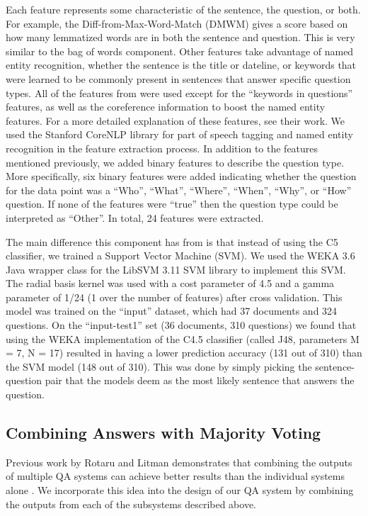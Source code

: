 \documentclass[11pt,letterpaper]{article}
\begin{document}
Each feature represents some characteristic of the sentence, the
question, or both.  For example, the Diff-from-Max-Word-Match (DMWM)
gives a score based on how many lemmatized words are in both the
sentence and question.  This is very similar to the bag of words
component.  Other features take advantage of named entity recognition,
whether the sentence is the title or dateline, or keywords that were
learned to be commonly present in sentences that answer specific
question types.  All of the features from \cite{Ng00amachine} were
used except for the ``keywords in questions'' features, as well as the
coreference information to boost the named entity features.  For a
more detailed explanation of these features, see their work.  We used
the Stanford CoreNLP library for part of speech tagging
\cite{Toutanova00enrichingthe} and named entity recognition
\cite{Finkel05incorporatingnon-local} in the feature extraction
process.  In addition to the features mentioned previously, we added
binary features to describe the question type.  More specifically, six
binary features were added indicating whether the question for the
data point was a ``Who'', ``What'', ``Where'', ``When'', ``Why'', or
``How'' question.  If none of the features were ``true'' then the
question type could be interpreted as ``Other''.   In total, 24
features were extracted.

The main difference this component has from \cite{Ng00amachine} is
that instead of using the C5 classifier, we trained a Support Vector
Machine (SVM).  We used the WEKA 3.6 \cite{Hall_theweka} Java wrapper
class for the LibSVM 3.11 \cite{Chang01libsvm:a} SVM library to
implement this SVM.  The radial basis kernel was used with a cost
parameter of 4.5 and a gamma parameter of 1/24 (1 over the number of
features) after cross validation.   This model was trained on the
``input'' dataset, which had 37 documents and 324 questions.  On the
``input-test1'' set (36 documents, 310 questions) we found that using
the WEKA implementation of the C4.5 classifier (called J48,
parameters M = 7, N = 17) resulted in having a lower prediction
accuracy (131 out of 310) than the SVM model (148 out of 310).  This was
done by simply picking the sentence-question pair that the models deem as
the most likely sentence that answers the question. 


\subsection{Combining Answers with Majority Voting}
Previous work by Rotaru and Litman demonstrates that combining
the outputs of multiple QA systems can achieve better results than the
individual systems alone \cite{rotaru2005}. We incorporate this idea
into the design of our QA system by combining the outputs from each of
the subsystems described above.
\end{document}
